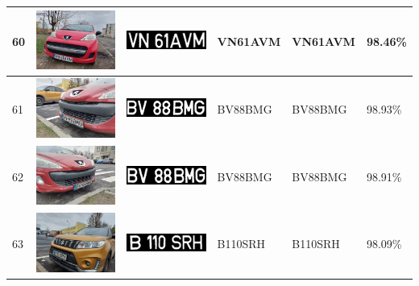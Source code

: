 \documentclass[a4paper,12pt]{report}
\begin{document}
\begin{longtable}{| m{0.6cm} | m{3cm} | m{3cm} | m{1.8cm} | m{1.8cm} | m{1.8cm} |}
    60  & \includegraphics[width=3cm,keepaspectratio]{dataset/34_d1.jpg}  & \includegraphics[width=3cm,keepaspectratio]{segmentari/60.jpg}  & VN61AVM             & VN61AVM              & 98.46\%    \\ \hline
    61  & \includegraphics[width=3cm,keepaspectratio]{dataset/35_d1.jpg}  & \includegraphics[width=3cm,keepaspectratio]{segmentari/61.jpg}  & BV88BMG             & BV88BMG              & 98.93\%    \\ \hline
    62  & \includegraphics[width=3cm,keepaspectratio]{dataset/35_s1.jpg}  & \includegraphics[width=3cm,keepaspectratio]{segmentari/62.jpg}  & BV88BMG             & BV88BMG              & 98.91\%    \\ \hline
    63  & \includegraphics[width=3cm,keepaspectratio]{dataset/36_d1.jpg}  & \includegraphics[width=3cm,keepaspectratio]{segmentari/63.jpg}  & B110SRH             & B110SRH              & 98.09\%    \\ \hline

\end{longtable}
\end{document}
